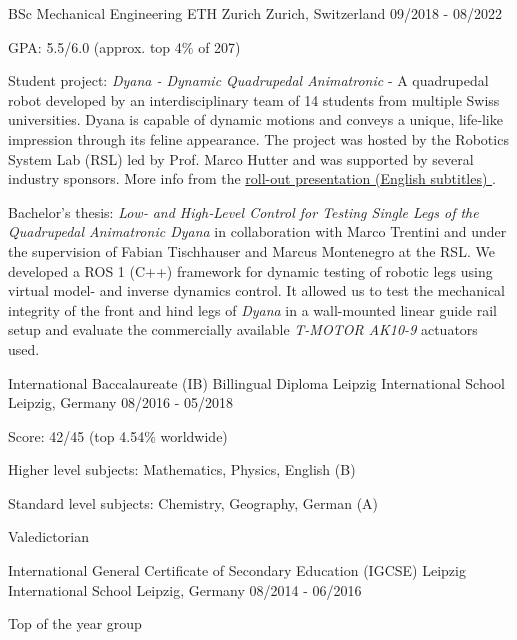 \begin{cventries}
  \cventry
    {BSc Mechanical Engineering} %
    {ETH Zurich} %
    {Zurich, Switzerland} %
    {09/2018 - 08/2022} %
    {
      \begin{cvitems} %
        \item GPA: 5.5/6.0 (approx. top 4\% of 207)
        \item Student project: \textit{Dyana - Dynamic Quadrupedal Animatronic} - A quadrupedal robot developed by an interdisciplinary team of 14 students from multiple Swiss universities. Dyana is capable of dynamic motions and conveys a unique, life‑like impression through its feline appearance. The project was hosted by the Robotics System Lab (RSL) led by Prof. Marco Hutter and was supported by several industry sponsors. More info from the \href{https://www.youtube.com/watch?v=--waMaVgZAg}{roll-out presentation (English subtitles) \ExternalLink}.
        \item Bachelor's thesis: \textit{Low‑ and High‑Level Control for Testing Single Legs of the Quadrupedal Animatronic Dyana} in collaboration with Marco Trentini and under the supervision of Fabian Tischhauser and Marcus Montenegro at the RSL. We developed a ROS 1 (C++) framework for dynamic testing of robotic legs using virtual model- and inverse dynamics control. It allowed us to test the mechanical integrity of the front and hind legs of \textit{Dyana} in a wall-mounted linear guide rail setup and evaluate the commercially available \textit{T-MOTOR AK10-9} actuators used.
      \end{cvitems}
    }

  \cventry
  {International Baccalaureate (IB) Billingual Diploma} %
  {Leipzig International School} %
  {Leipzig, Germany} %
  {08/2016 - 05/2018} %
  {
    \begin{cvitems}
      \item Score: 42/45 (top 4.54\% worldwide)
      \item Higher level subjects: Mathematics, Physics, English (B)
      \item Standard level subjects: Chemistry, Geography, German (A)
      \item Valedictorian
    \end{cvitems}
  }

  \cventry
  {International General Certificate of Secondary Education (IGCSE)}
  {Leipzig International School}
  {Leipzig, Germany}
  {08/2014 - 06/2016}
  {
    \begin{cvitems}
      \item {Top of the year group}
    \end{cvitems}
  }
\end{cventries}
